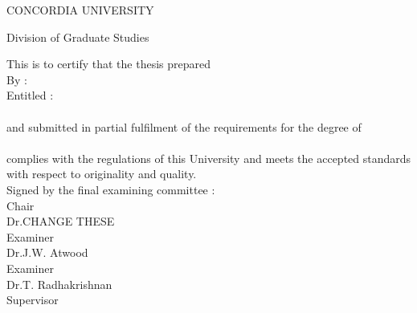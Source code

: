 {  \begin{titlepage}
     \vspace*{1ex}
     \begin{center}
        CONCORDIA UNIVERSITY
     \end{center}
     \begin{center}
        Division of Graduate Studies
     \end{center}
     \vspace{3ex}
     This is to certify that the thesis prepared\\[2ex]
     By :\hspace{40pt}{\bf Shayan Eskandari}\\[2ex]
     Entitled :\hspace*{13pt}{\bf Privacy and Usability:}\\ 
     \hspace*{62pt}{\bf on Bitcoin} \\[2ex]
    and submitted in partial fulfilment of the requirements for the degree
    of\\[2ex]
    \hspace*{62pt}{\bf Master of Computer and Electical Engineering}\\[2ex]
    complies with the regulations of this University and meets the accepted
    standards with respect to originality and quality. \\[2ex]
    Signed by the final examining committee : \\[5ex]
    \hspace*{77pt}\underline{\hspace{234pt}} Chair\\
    \hspace*{77pt}Dr.\@ CHANGE THESE\\[2.5ex]
    \hspace*{77pt}\underline{\hspace{234pt}} Examiner\\
    \hspace*{77pt}Dr.\@ J.W. Atwood\\[2.5ex]
    \hspace*{77pt}\underline{\hspace{234pt}} Examiner\\
    \hspace*{77pt}Dr.\@ T. Radhakrishnan\\[2.5ex]
    \hspace*{77pt}\underline{\hspace{234pt}} Supervisor \\

\end{titlepage}}
